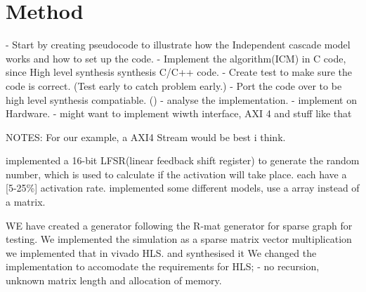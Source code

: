 \chapter{Method} \label{methode}
- Start by creating pseudocode to illustrate how the Independent cascade model works and how to set up the code.
- Implement the algorithm(ICM) in C code, since High level synthesis synthesis C/C++ code. 
- Create test to make sure the code is correct. (Test early to catch problem early.)
- Port the code over to be high level synthesis compatiable. () 
- analyse the implementation.
- implement on Hardware.
- might want to implement wiwth interface, AXI 4 and stuff like that 


NOTES: 
For our example, a AXI4 Stream would be best i think.

implemented a 16-bit LFSR(linear feedback shift register) to generate the random number, which is used to calculate if the activation will take place.
each have a [5-25\%] activation rate. implemented some different models, use a array instead of a matrix. 

WE have created a generator following the R-mat generator for sparse graph for testing.
We implemented the simulation as a sparse matrix vector multiplication
we implemented that in vivado HLS. and synthesised it
We changed the implementation to accomodate the requirements for HLS; - no recursion, unknown matrix length and allocation of memory. 